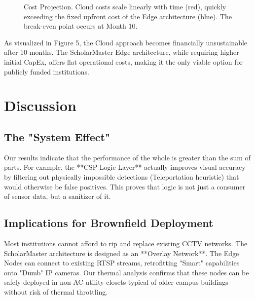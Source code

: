 \documentclass[conference]{IEEEtran}
\begin{document}
\begin{figure}[htbp]
\centering
{}
\caption{Cost Projection. Cloud costs scale linearly with time (red), quickly exceeding the fixed upfront cost of the Edge architecture (blue). The break-even point occurs at Month 10.}
\label{fig:cost}
\end{figure}

As visualized in Figure 5, the Cloud approach becomes financially unsustainable after 10 months. The ScholarMaster Edge architecture, while requiring higher initial CapEx, offers flat operational costs, making it the only viable option for publicly funded institutions.

\section{Discussion}

\subsection{The "System Effect"}
Our results indicate that the performance of the whole is greater than the sum of parts. For example, the **CSP Logic Layer** \cite{p4} actually improves visual accuracy by filtering out physically impossible detections (Teleportation heuristic) that would otherwise be false positives. This proves that logic is not just a consumer of sensor data, but a sanitizer of it.

\subsection{Implications for Brownfield Deployment}
Most institutions cannot afford to rip and replace existing CCTV networks. The ScholarMaster architecture is designed as an **Overlay Network**. The Edge Nodes can connect to existing RTSP streams, retrofitting "Smart" capabilities onto "Dumb" IP cameras. Our thermal analysis confirms that these nodes can be safely deployed in non-AC utility closets typical of older campus buildings without risk of thermal throttling.
\end{document}
